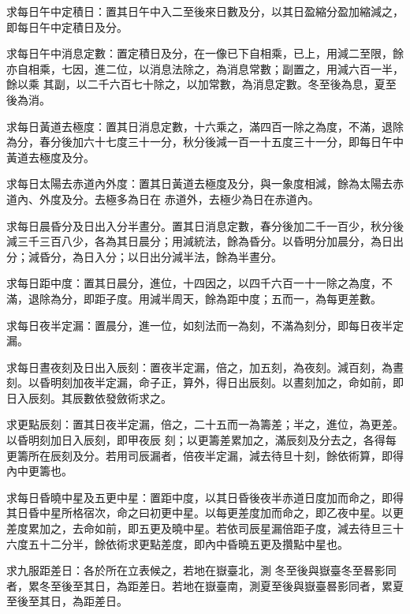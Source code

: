 \begin{pinyinscope}
 求每日午中定積日：置其日午中入二至後來日數及分，以其日盈縮分盈加縮減之，即每日午中定積日及分。



 求每日午中消息定數：置定積日及分，在一像已下自相乘，已上，用減二至限，餘亦自相乘，七因，進二位，以消息法除之，為消息常數；副置之，用減六百一半，餘以乘
 其副，以二千六百七十除之，以加常數，為消息定數。冬至後為息，夏至後為消。



 求每日黃道去極度：置其日消息定數，十六乘之，滿四百一除之為度，不滿，退除為分，春分後加六十七度三十一分，秋分後減一百一十五度三十一分，即每日午中黃道去極度及分。



 求每日太陽去赤道內外度：置其日黃道去極度及分，與一象度相減，餘為太陽去赤道內、外度及分。去極多為日在
 赤道外，去極少為日在赤道內。



 求每日晨昏分及日出入分半晝分。置其日消息定數，春分後加二千一百少，秋分後減三千三百八少，各為其日晨分；用減統法，餘為昏分。以昏明分加晨分，為日出分；減昏分，為日入分；以日出分減半法，餘為半晝分。



 求每日距中度：置其日晨分，進位，十四因之，以四千六百一十一除之為度，不滿，退除為分，即距子度。用減半周天，餘為距中度；五而一，為每更差數。



 求每日夜半定漏：置晨分，進一位，如刻法而一為刻，不滿為刻分，即每日夜半定漏。



 求每日晝夜刻及日出入辰刻：置夜半定漏，倍之，加五刻，為夜刻。減百刻，為晝刻。以昏明刻加夜半定漏，命子正，算外，得日出辰刻。以晝刻加之，命如前，即日入辰刻。其辰數依發斂術求之。



 求更點辰刻：置其日夜半定漏，倍之，二十五而一為籌差；半之，進位，為更差。以昏明刻加日入辰刻，即甲夜辰
 刻；以更籌差累加之，滿辰刻及分去之，各得每更籌所在辰刻及分。若用司辰漏者，倍夜半定漏，減去待旦十刻，餘依術算，即得內中更籌也。



 求每日昏曉中星及五更中星：置距中度，以其日昏後夜半赤道日度加而命之，即得其日昏中星所格宿次，命之曰初更中星。以每更差度加而命之，即乙夜中星。以更差度累加之，去命如前，即五更及曉中星。若依司辰星漏倍距子度，減去待旦三十六度五十二分半，餘依術求更點差度，即內中昏曉五更及攢點中星也。



 求九服距差日：各於所在立表候之，若地在嶽臺北，測
 冬至後與嶽臺冬至晷影同者，累冬至後至其日，為距差日。若地在嶽臺南，測夏至後與嶽臺晷影同者，累夏至後至其日，為距差日。




\end{pinyinscope}
